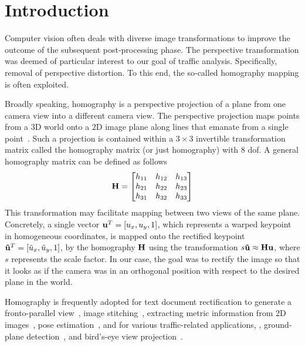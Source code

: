 \section{Introduction}
\label{sec:HomographyIntroduction}

Computer vision often deals with diverse image transformations to improve the outcome of the subsequent post-processing phase. The perspective transformation was deemed of particular interest to our goal of traffic analysis. Specifically, removal of perspective distortion. To this end, the so-called homography mapping is often exploited.

Broadly speaking, homography is a perspective projection of a plane from one camera view into a different camera view. The perspective projection maps points from a $3$D world onto a $2$D image plane along lines that emanate from a single point~\cite{geetha2013automatic, bousaid2020perspective}. Such a projection is contained within a $3 \times 3$ invertible transformation matrix called the homography matrix (or just homography) with $8$ \gls{dof}. A general homography matrix can be defined as follows
\begin{equation}
    \label{eq:HomographyMatrix}
    \mathbf{H} =
    \begin{bmatrix}
        h_{11} & h_{12} & h_{13} \\
        h_{21} & h_{22} & h_{23} \\
        h_{31} & h_{32} & h_{33}
    \end{bmatrix}
\end{equation}
This transformation may facilitate mapping between two views of the same plane. Concretely, a single vector ${\mathbf{u}}^T = \left[ {u_x, u_y, 1} \right]$, which represents a warped keypoint in homogeneous coordinates, is mapped onto the rectified keypoint ${\mathbf{\tilde{u}}}^T = \left[ {\tilde{u}_x, \tilde{u}_y, 1} \right]$, by the homography $\mathbf{H}$ using the transformation $s \mathbf{\tilde{u}} \approx \mathbf{H} \mathbf{u}$, where $s$ represents the scale factor. In our case, the goal was to rectify the image so that it looks as if the camera was in an orthogonal position with respect to the desired plane in the world.

Homography is frequently adopted for text document rectification to generate a fronto-parallel view~\cite{lu2005perspective, miao2006perspective}, image stitching~\cite{adel2014image, gao2011constructing}, extracting metric information from $2$D images~\cite{zhang2000flexible}, pose estimation~\cite{mariyanayagam2018poseestim}, and for various traffic-related applications, \egtext{}, ground-plane detection~\cite{arrospide2010homography}, and bird's-eye view projection~\cite{luo2010low}.


